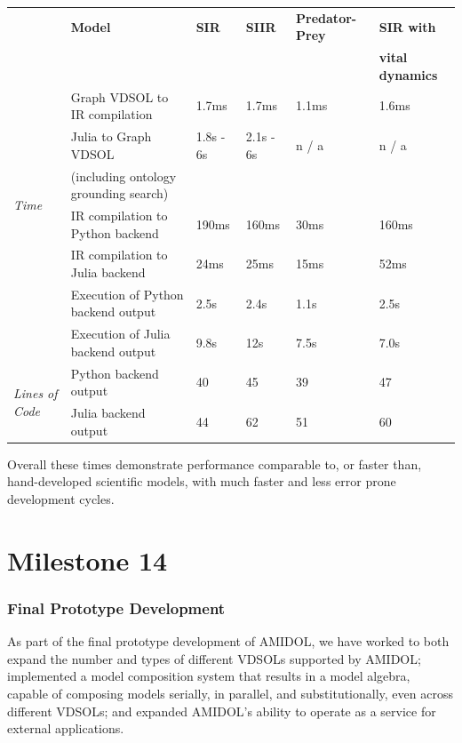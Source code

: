 \documentclass[12pt]{galois-whitepaper}
\begin{document}
{ \footnotesize
\begin{tabular}{|llllll|}
 \hline
  & \textbf{Model}	& \textbf{SIR}	& \textbf{SIIR}	& \textbf{Predator-Prey}	&
                                                  \textbf{SIR with}\\
  & & & & & \textbf{vital dynamics}\\
  \hline
   \multirow{6}{*}{\textit{Time}}     & Graph VDSOL to IR compilation	& 1.7ms	& 1.7ms	& 1.1ms	&
                                                                  1.6ms\\
  & Julia to Graph VDSOL
                & 1.8s - 6s	&2.1s - 6s	& n / a	& n / a\\
  & (including ontology grounding search) & & & &\\
        & IR compilation to Python backend	& 190ms	& 160ms & 30ms
                                                                  &
                                                                    160ms\\
        & IR compilation to Julia backend & 24ms	& 25ms	& 15ms
                                                & 52ms\\
        & Execution of Python backend output	& 2.5s	& 2.4s	& 1.1s
                                                & 2.5s\\
	& Execution of Julia backend output	& 9.8s	& 12s	& 7.5s
                                                & 7.0s\\
  \hline
  \hline
  \multirow{2}{*}{\textit{Lines of Code}} & Python backend output & 40
                                        & 45 & 39	& 47\\
        & Julia backend output	& 44	& 62	& 51	& 60\\
  \hline
\end{tabular}
}

Overall these times demonstrate performance comparable to, or faster
than, hand-developed scientific models, with much faster and less
error prone development cycles.

\part{Milestone 14}

\section{Final Prototype Development}

As part of the final prototype development of AMIDOL, we have worked
to both expand the number and types of different VDSOLs supported by
AMIDOL; implemented a model composition system that results in a model
algebra, capable of composing models serially, in parallel, and
substitutionally, even across different VDSOLs; and expanded AMIDOL's
ability to operate as a service for external applications.
\end{document}
